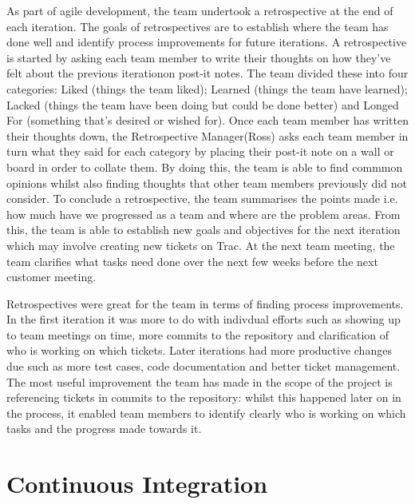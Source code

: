 \documentclass{l3proj}
\begin{document}
As part of agile development, the team undertook a retrospective at the end of each iteration. The goals of retrospectives are
to establish where the team has done well and identify process improvements for future iterations. A retrospective is started
by asking each team member to write their thoughts on how they've felt about the previous iterationon post-it notes.
The team divided these into four categories: Liked (things the team liked); Learned (things the team have learned);
Lacked (things the team have been doing but could be done better) and Longed For (something that's desired or wished for).
Once each team member has written their thoughts down, the Retrospective Manager(Ross) asks each team member in turn
what they said for each category by placing their post-it note on a wall or board in order to collate them. By doing this,
the team is able to find commmon opinions whilst also finding thoughts that other team members previously did not
consider. To conclude a retrospective, the team summarises the points made i.e. how much have we progressed as a team
and where are the problem areas. From this, the team is able to establish new goals and objectives for the next iteration
which may involve creating new tickets on Trac. At the next team meeting, the team clarifies what tasks need done over
the next few weeks before the next customer meeting.

Retrospectives were great for the team in terms of finding process improvements. In the first iteration it was more to
do with indivdual efforts such as showing up to team meetings on time, more commits to the repository and clarification
of who is working on which tickets. Later iterations had more productive changes due such as more test cases, code
documentation and better ticket management. The most useful improvement the team has made in the scope of the project
is referencing tickets in commits to the repository: whilst this happened later on in the process, it enabled team members
to identify clearly who is working on which tasks and the progress made towards it.


\section{Continuous Integration}
\label{sec:continuous-integration}

\end{document}

